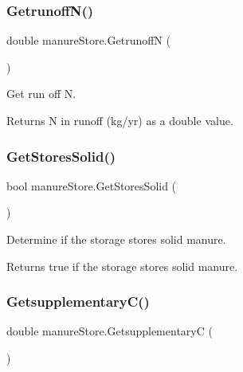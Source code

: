 \subsubsection{\texorpdfstring{GetrunoffN()}{GetrunoffN()}}
{\footnotesize\ttfamily double manure\+Store.\+GetrunoffN (\begin{DoxyParamCaption}{ }\end{DoxyParamCaption})\hspace{0.3cm}{\ttfamily [inline]}}



Get run off N. 

\begin{DoxyReturn}{Returns}
N in runoff (kg/yr) as a double value. 
\end{DoxyReturn}
\mbox{\label{classmanure_store_ad1ec2e50223e778b18e3a76ae6b5a627}} 
\subsubsection{\texorpdfstring{GetStoresSolid()}{GetStoresSolid()}}
{\footnotesize\ttfamily bool manure\+Store.\+Get\+Stores\+Solid (\begin{DoxyParamCaption}{ }\end{DoxyParamCaption})\hspace{0.3cm}{\ttfamily [inline]}}



Determine if the storage stores solid manure. 

\begin{DoxyReturn}{Returns}
true if the storage stores solid manure. 
\end{DoxyReturn}
\mbox{\label{classmanure_store_add321ae5ffcd148e411d00494d9fe890}} 
\subsubsection{\texorpdfstring{GetsupplementaryC()}{GetsupplementaryC()}}
{\footnotesize\ttfamily double manure\+Store.\+GetsupplementaryC (\begin{DoxyParamCaption}{ }\end{DoxyParamCaption})\hspace{0.3cm}{\ttfamily [inline]}}



